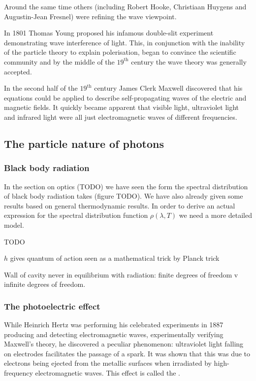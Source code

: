 Around the same time others (including Robert Hooke, Christiaan Huygens and Augustin-Jean Fresnel) were refining the wave viewpoint.

In 1801 Thomas Young proposed his infamous double-slit experiment demonstrating wave interference of light. This, in conjunction with the inability of the particle theory to explain polerisation, began to convince the scientific community and by the middle of the $19^\text{th}$ century the wave theory was generally accepted.

In the second half of the $19^\text{th}$ century James Clerk Maxwell discovered that his equations could be applied to describe self-propagating waves of the electric and magnetic fields. It quickly became apparent that visible light, ultraviolet light and infrared light were all just electromagnetic waves of different frequencies.

\subsection{The particle nature of photons}
\subsubsection{Black body radiation}
In the section on optics (TODO) we have seen the form the spectral distribution of black body radiation takes (figure TODO). We have also already given some results based on general thermodynamic results. In order to derive an actual expression for the spectral distribution function $\rho(\lambda, T)$ we need a more detailed model.

TODO

$h$ gives quantum of action
seen as a mathematical trick by Planck trick

Wall of cavity never in equilibrium with radiation: finite degrees of freedom v infinite degrees of freedom.

\subsubsection{The photoelectric effect}
While Heinrich Hertz was performing his celebrated experiments in 1887 producing and detecting electromagnetic waves, experimentally verifying Maxwell's theory, he discovered a peculiar phenomenon: ultraviolet light falling on electrodes facilitates the passage of a spark. It was shown that this was due to electrons being ejected from the metallic surfaces when irradiated by high-frequency electromagnetic waves. This effect is called the .

